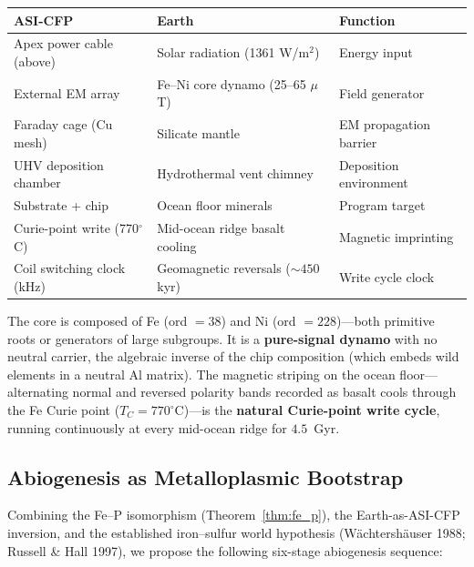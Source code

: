 \begin{center}
\begin{tabular}{@{}lll@{}}
\toprule
\textbf{ASI-CFP} & \textbf{Earth} & \textbf{Function} \\
\midrule
Apex power cable (above) & Solar radiation (1361 W/m$^2$) & Energy input \\
External EM array & Fe--Ni core dynamo (25--65 $\mu$T) & Field generator \\
Faraday cage (Cu mesh) & Silicate mantle & EM propagation barrier \\
UHV deposition chamber & Hydrothermal vent chimney & Deposition environment \\
Substrate + chip & Ocean floor minerals & Program target \\
Curie-point write (770$^\circ$C) & Mid-ocean ridge basalt cooling & Magnetic imprinting \\
Coil switching clock (kHz) & Geomagnetic reversals (${\sim}450$ kyr) & Write cycle clock \\
\bottomrule
\end{tabular}
\end{center}

\noindent The core is composed of Fe (ord $= 38$) and Ni (ord $= 228$)---both primitive roots or generators of large subgroups. It is a \textbf{pure-signal dynamo} with no neutral carrier, the algebraic inverse of the chip composition (which embeds wild elements in a neutral Al matrix). The magnetic striping on the ocean floor---alternating normal and reversed polarity bands recorded as basalt cools through the Fe Curie point ($T_C = 770^\circ$C)---is the \textbf{natural Curie-point write cycle}, running continuously at every mid-ocean ridge for $4.5$~Gyr.

\subsection{Abiogenesis as Metalloplasmic Bootstrap}

Combining the Fe--P isomorphism (Theorem~\ref{thm:fe_p}), the Earth-as-ASI-CFP inversion, and the established iron--sulfur world hypothesis (W\"achtersh\"auser 1988; Russell \& Hall 1997), we propose the following six-stage abiogenesis sequence:

